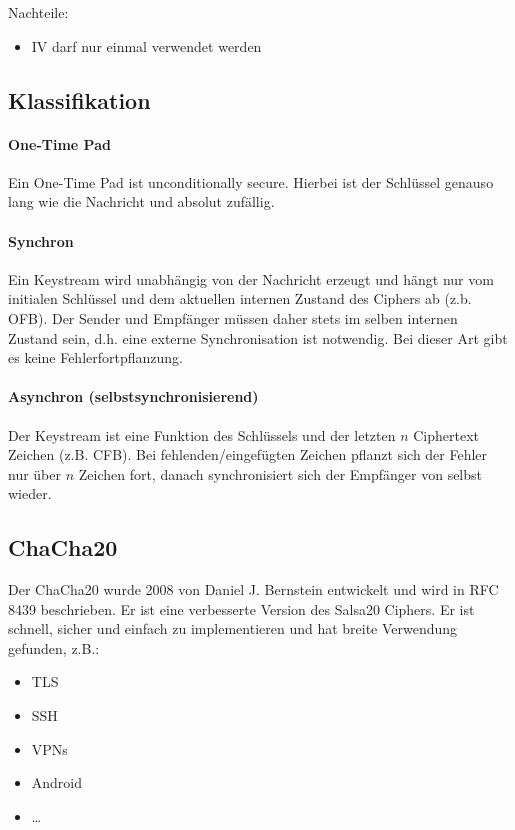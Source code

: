 Nachteile: 
\begin{itemize}
    \item IV darf nur einmal verwendet werden
\end{itemize}

\subsection{Klassifikation}

\paragraph{One-Time Pad}

Ein One-Time Pad ist unconditionally secure. Hierbei ist der Schlüssel genauso lang wie die Nachricht und absolut zufällig.

\paragraph{Synchron}

Ein Keystream wird unabhängig von der Nachricht erzeugt und hängt nur vom initialen Schlüssel und dem aktuellen internen Zustand des Ciphers ab (z.b. OFB).
Der Sender und Empfänger müssen daher stets im selben internen Zustand sein, d.h. eine externe Synchronisation ist notwendig.
Bei dieser Art gibt es keine Fehlerfortpflanzung.

\paragraph{Asynchron (selbstsynchronisierend)}

Der Keystream ist eine Funktion des Schlüssels und der letzten $n$ Ciphertext Zeichen (z.B. CFB).
Bei fehlenden/eingefügten Zeichen pflanzt sich der Fehler nur über $n$ Zeichen fort,
danach synchronisiert sich der Empfänger von selbst wieder.

\subsection{ChaCha20}

Der ChaCha20 wurde 2008 von Daniel J. Bernstein entwickelt und wird in RFC 8439 beschrieben. Er ist eine verbesserte Version des Salsa20 Ciphers.
Er ist schnell, sicher und einfach zu implementieren und hat breite Verwendung gefunden, z.B.: 

\begin{itemize}
    \item TLS
    \item SSH 
    \item VPNs 
    \item Android 
    \item \ldots
\end{itemize}

